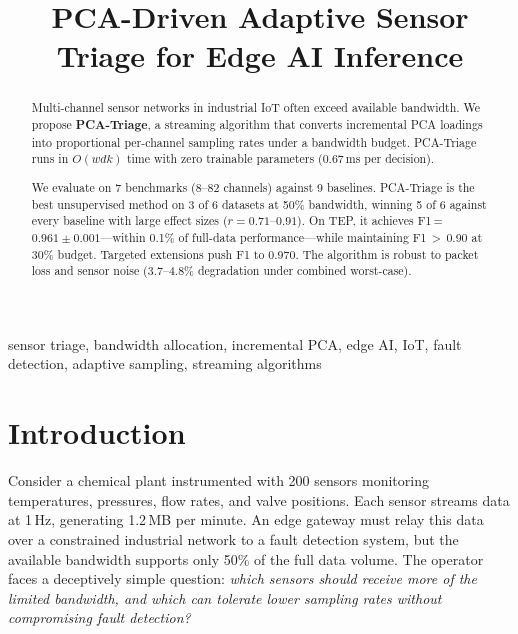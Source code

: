 \documentclass[journal]{IEEEtran}
\begin{document}
\title{PCA-Driven Adaptive Sensor Triage for Edge AI Inference}

\author{
}

\maketitle

\begin{abstract}
Multi-channel sensor networks in industrial IoT often exceed available bandwidth. We propose \textbf{PCA-Triage}, a streaming algorithm that converts incremental PCA loadings into proportional per-channel sampling rates under a bandwidth budget. PCA-Triage runs in $O(wdk)$ time with zero trainable parameters (0.67\,ms per decision).

We evaluate on 7 benchmarks (8--82 channels) against 9 baselines. PCA-Triage is the best unsupervised method on 3 of 6 datasets at 50\% bandwidth, winning 5 of 6 against every baseline with large effect sizes ($r = 0.71$--$0.91$). On TEP, it achieves F1\,=\,$0.961 \pm 0.001$---within 0.1\% of full-data performance---while maintaining F1\,$>$\,0.90 at 30\% budget. Targeted extensions push F1 to 0.970. The algorithm is robust to packet loss and sensor noise (3.7--4.8\% degradation under combined worst-case).
\end{abstract}

\begin{IEEEkeywords}
sensor triage, bandwidth allocation, incremental PCA, edge AI, IoT, fault detection, adaptive sampling, streaming algorithms
\end{IEEEkeywords}

\section{Introduction}
\label{sec:intro}

Consider a chemical plant instrumented with 200 sensors monitoring temperatures, pressures, flow rates, and valve positions. Each sensor streams data at 1\,Hz, generating 1.2\,MB per minute. An edge gateway must relay this data over a constrained industrial network to a fault detection system, but the available bandwidth supports only 50\% of the full data volume. The operator faces a deceptively simple question: \textit{which sensors should receive more of the limited bandwidth, and which can tolerate lower sampling rates without compromising fault detection?}
\end{document}
